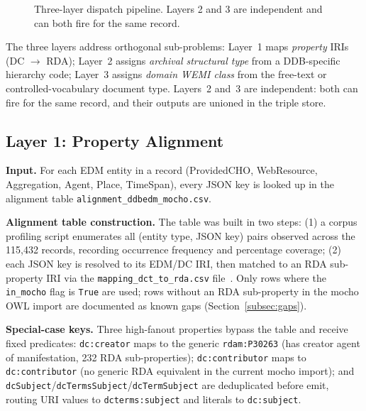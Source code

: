 \begin{figure}[t]
\centering
{}
\caption{Three-layer dispatch pipeline. Layers 2 and 3 are independent and
  can both fire for the same record.}
\label{fig:pipeline}
\end{figure}

\noindent
The three layers address orthogonal sub-problems:
Layer~1 maps \emph{property} IRIs (DC $\to$ RDA);
Layer~2 assigns \emph{archival structural type} from a DDB-specific hierarchy
code;
Layer~3 assigns \emph{domain WEMI class} from the free-text or
controlled-vocabulary document type.
Layers~2 and~3 are independent: both can fire for the same record, and their
outputs are unioned in the triple store.

\subsection{Layer 1: Property Alignment}

\noindent
\textbf{Input.} For each EDM entity in a record (ProvidedCHO, WebResource,
Aggregation, Agent, Place, TimeSpan), every JSON key is looked up in the
alignment table \texttt{alignment\_ddbedm\_mocho.csv}.

\noindent
\textbf{Alignment table construction.}
The table was built in two steps:
(1) a corpus profiling script enumerates all (entity type, JSON key) pairs
observed across the 115{,}432 records, recording occurrence frequency and
percentage coverage;
(2) each JSON key is resolved to its EDM/DC IRI, then matched to an RDA
sub-property IRI via the \texttt{mapping\_dct\_to\_rda.csv} file~.
Only rows where the \texttt{in\_mocho} flag is \texttt{True} are used;
rows without an RDA sub-property in the mocho OWL import are documented as
known gaps (Section~\ref{subsec:gaps}).

\noindent
\textbf{Special-case keys.}
Three high-fanout properties bypass the table and receive fixed predicates:
\texttt{dc:creator} maps to the generic \texttt{rdam:P30263} (has creator
agent of manifestation, 232 RDA sub-properties);
\texttt{dc:contributor} maps to \texttt{dc:contributor} (no generic RDA
equivalent in the current mocho import);
and \texttt{dcSubject}/\texttt{dcTermsSubject}/\texttt{dcTermSubject} are
deduplicated before emit, routing URI values to \texttt{dcterms:subject} and
literals to \texttt{dc:subject}.

